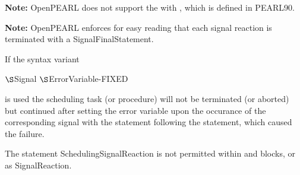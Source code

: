 \begin{grammarframe}
\end{grammarframe}

\textbf{Note:} OpenPEARL does not support the  with , which is defined in PEARL90.

\textbf{Note:} OpenPEARL enforces for easy reading that each signal reaction is terminated with a SignalFinalStatement.

If the syntax variant 

\x {} $\S $Signal  \kw{(} $\S $ErrorVariable-FIXED \kw{)} \kw{;}

is used the scheduling task (or procedure) will not be terminated (or aborted)
but continued after setting the error variable upon the occurance 
of the corresponding signal with the statement following the 
statement, which caused the failure.



The statement SchedulingSignalReaction is not permitted within 
and  blocks, or as SignalReaction.

